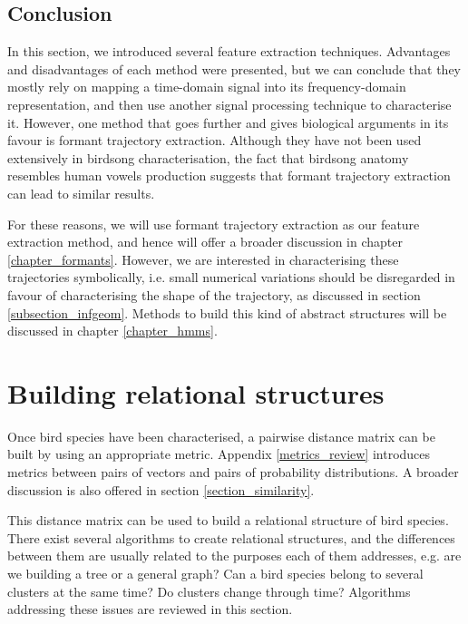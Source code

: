 \documentclass[../main.tex]{subfiles} \label{chapter_soa}
\begin{document}
\subsection{Conclusion}
In this section, we introduced several feature extraction techniques. Advantages and disadvantages of each method were presented, but we can conclude that they mostly rely on mapping a time-domain signal into its frequency-domain representation, and then use another signal processing technique to characterise it. However, one method that goes further and gives biological arguments in its favour is formant trajectory extraction. Although they have not been used extensively in birdsong characterisation, the fact that birdsong anatomy resembles human vowels production suggests that formant trajectory extraction can lead to similar results.
\par For these reasons, we will use formant trajectory extraction as our feature extraction method, and hence will offer a broader discussion in chapter \ref{chapter_formants}. However, we are interested in characterising these trajectories symbolically, i.e. small numerical variations should be disregarded in favour of characterising the shape of the trajectory, as discussed in section \ref{subsection_infgeom}. Methods to build this kind of abstract structures will be discussed in chapter \ref{chapter_hmms}.


\section{Building relational structures}\label{algorithms_review}
Once bird species have been characterised, a pairwise distance matrix can be built by using an appropriate metric. Appendix \ref{metrics_review} introduces metrics between pairs of vectors and pairs of probability distributions. A broader discussion is also offered in section \ref{section_similarity}.
\par This distance matrix can be used to build a relational structure of bird species. There exist several algorithms to create relational structures, and the differences between them are usually related to the purposes each of them addresses, e.g. are we building a tree or a general graph? Can a bird species belong to several clusters at the same time? Do clusters change through time? Algorithms addressing these issues are reviewed in this section.
\end{document}
